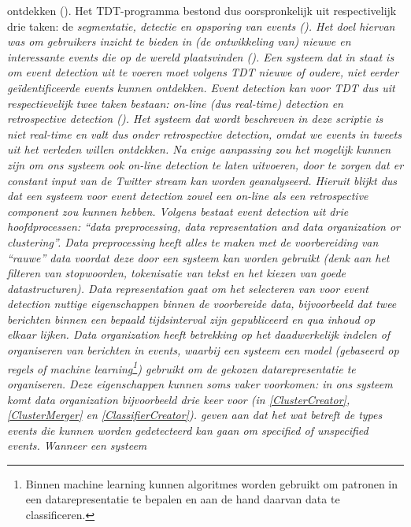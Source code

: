 ontdekken ({\citealt{allan2002introduction}). Het TDT-programma bestond dus oorspronkelijk uit 
respectivelijk drie taken: de \it{segmentatie}, \it{detectie} en \it{opsporing} van events 
(\citealt{atefeh2013survey}). Het doel hiervan was om gebruikers inzicht te bieden in (de 
ontwikkeling van) nieuwe en interessante events die op de wereld 
plaatsvinden ({\citealt{allan2002introduction}).
\vl
Een systeem dat in staat is om event detection uit te voeren moet volgens 
TDT nieuwe of oudere, niet eerder ge\"identificeerde events kunnen ontdekken. 
Event detection kan voor TDT dus uit respectievelijk twee taken bestaan: \it{on-line} (dus 
\it{real-time}) \it{detection} en \it{retrospective detection} (\citealt{yang1998study}). Het systeem dat 
wordt beschreven in deze scriptie is niet real-time en valt dus onder retrospective detection, 
omdat we events in tweets uit het verleden willen ontdekken. Na enige aanpassing 
zou het mogelijk kunnen zijn om ons systeem ook on-line detection te laten uitvoeren, door te 
zorgen dat er constant input van de Twitter stream kan worden geanalyseerd. 
Hieruit blijkt dus dat een systeem voor event detection zowel een on-line als een retrospective 
component zou kunnen hebben.
\vl
Volgens \citet{atefeh2013survey} bestaat event detection uit drie hoofdprocessen: \it{``data 
preprocessing, data representation and data organization or clustering''}. \it{Data 
preprocessing} heeft alles te maken met de voorbereiding van ``rauwe'' data voordat 
deze door een systeem kan worden gebruikt (denk aan het filteren van 
stopwoorden, tokenisatie van tekst en het kiezen van goede datastructuren). 
\it{Data representation} gaat om het selecteren van voor event detection nuttige 
eigenschappen binnen de voorbereide data, bijvoorbeeld dat twee berichten binnen 
een bepaald tijdsinterval zijn gepubliceerd en qua inhoud op elkaar lijken. \it{Data 
organization} heeft betrekking op het daadwerkelijk indelen of organiseren van 
berichten in events, waarbij een systeem een model (gebaseerd op regels of 
\it{machine learning}\footnote{Binnen machine learning kunnen algoritmes worden 
gebruikt om patronen in een datarepresentatie te bepalen en aan de hand daarvan
data te classificeren.}) gebruikt om de gekozen datarepresentatie te organiseren. 
Deze eigenschappen kunnen soms vaker voorkomen: in ons systeem komt data organization
bijvoorbeeld drie keer voor (in \ref{ClusterCreator}, \ref{ClusterMerger} en \ref{ClassifierCreator}).
\vl
\citet{atefeh2013survey} geven aan dat het wat betreft de types events die kunnen worden 
gedetecteerd kan gaan om \it{specified} of \it{unspecified} events. Wanneer een systeem 
}}
